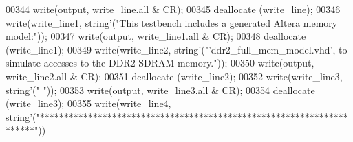 \begin{DoxyCode}
00344       \textcolor{vhdlchar}{write}\textcolor{vhdlchar}{(}\textcolor{vhdlchar}{output}\textcolor{vhdlchar}{,} \textcolor{vhdlchar}{write\_line}\textcolor{vhdlchar}{.}\textcolor{keywordflow}{all} \textcolor{vhdlchar}{&} \textcolor{vhdlchar}{CR}\textcolor{vhdlchar}{)};
00345       \textcolor{vhdlchar}{deallocate} \textcolor{vhdlchar}{(}\textcolor{vhdlchar}{write\_line}\textcolor{vhdlchar}{)};
00346       \textcolor{vhdlchar}{write}\textcolor{vhdlchar}{(}\textcolor{vhdlchar}{write\_line1}\textcolor{vhdlchar}{,} \textcolor{comment}{string}\textcolor{vhdlchar}{'}\textcolor{vhdlchar}{(}\textcolor{keyword}{"This testbench includes a generated Altera memory model:"}\textcolor{vhdlchar}{)}\textcolor{vhdlchar}{)};
00347       \textcolor{vhdlchar}{write}\textcolor{vhdlchar}{(}\textcolor{vhdlchar}{output}\textcolor{vhdlchar}{,} \textcolor{vhdlchar}{write\_line1}\textcolor{vhdlchar}{.}\textcolor{keywordflow}{all} \textcolor{vhdlchar}{&} \textcolor{vhdlchar}{CR}\textcolor{vhdlchar}{)};
00348       \textcolor{vhdlchar}{deallocate} \textcolor{vhdlchar}{(}\textcolor{vhdlchar}{write\_line1}\textcolor{vhdlchar}{)};
00349       \textcolor{vhdlchar}{write}\textcolor{vhdlchar}{(}\textcolor{vhdlchar}{write\_line2}\textcolor{vhdlchar}{,} \textcolor{comment}{string}\textcolor{vhdlchar}{'}\textcolor{vhdlchar}{(}\textcolor{keyword}{"'ddr2\_full\_mem\_model.vhd', to simulate accesses to the DDR2 SDRAM
       memory."}\textcolor{vhdlchar}{)}\textcolor{vhdlchar}{)};
00350       \textcolor{vhdlchar}{write}\textcolor{vhdlchar}{(}\textcolor{vhdlchar}{output}\textcolor{vhdlchar}{,} \textcolor{vhdlchar}{write\_line2}\textcolor{vhdlchar}{.}\textcolor{keywordflow}{all} \textcolor{vhdlchar}{&} \textcolor{vhdlchar}{CR}\textcolor{vhdlchar}{)};
00351       \textcolor{vhdlchar}{deallocate} \textcolor{vhdlchar}{(}\textcolor{vhdlchar}{write\_line2}\textcolor{vhdlchar}{)};
00352       \textcolor{vhdlchar}{write}\textcolor{vhdlchar}{(}\textcolor{vhdlchar}{write\_line3}\textcolor{vhdlchar}{,} \textcolor{comment}{string}\textcolor{vhdlchar}{'}\textcolor{vhdlchar}{(}\textcolor{keyword}{" "}\textcolor{vhdlchar}{)}\textcolor{vhdlchar}{)};
00353       \textcolor{vhdlchar}{write}\textcolor{vhdlchar}{(}\textcolor{vhdlchar}{output}\textcolor{vhdlchar}{,} \textcolor{vhdlchar}{write\_line3}\textcolor{vhdlchar}{.}\textcolor{keywordflow}{all} \textcolor{vhdlchar}{&} \textcolor{vhdlchar}{CR}\textcolor{vhdlchar}{)};
00354       \textcolor{vhdlchar}{deallocate} \textcolor{vhdlchar}{(}\textcolor{vhdlchar}{write\_line3}\textcolor{vhdlchar}{)};
00355       \textcolor{vhdlchar}{write}\textcolor{vhdlchar}{(}\textcolor{vhdlchar}{write\_line4}\textcolor{vhdlchar}{,} \textcolor{comment}{string}\textcolor{vhdlchar}{'}\textcolor{vhdlchar}{(}\textcolor{keyword}{"**********************************************************************"}\textcolor{vhdlchar}{)}\textcolor{vhdlchar}{)}

\end{DoxyCode}
